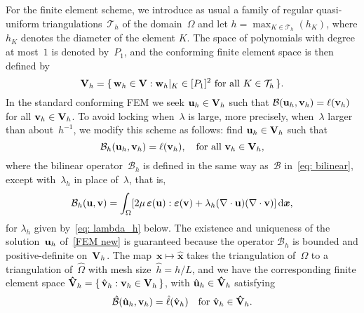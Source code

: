 \documentclass[11pt]{article}
\newcommand{\calB}{\mathcal{B}}
\newcommand{\calBhat}{\hat{\mathcal{B}}}
\newcommand{\vu}{{\bf u}}
\newcommand{\vv}{{\bf v}}
\newcommand{\vV}{{\bf V}}
\newcommand{\vVhat}{\mathbf{\hat V}}
\newcommand{\vw}{{\bf w}}
\newcommand{\bsx}{{\boldsymbol{x}}}
\numberwithin{equation}{section}
\newcommand{\veps}{{\boldsymbol{\varepsilon}}}
\newcommand{\ud}{\mathrm{d}}
\begin{document}
For the finite element scheme, we introduce as usual a family of regular 
quasi-uniform triangulations~$\mathcal{T}_h$ of the domain~$\Omega$ and let 
$h=\max_{K\in \mathcal{T}_h}(h_K)$, where $h_{K}$ denotes the diameter of 
the element $K$.  The space of polynomials with degree at most~$1$ is denoted  by~$P_1$, and the conforming finite element space is then defined by 
\[\vV_h=\{\,\vw_h \in {\bf V}:\text{$\vw_h |_K \in [P_1]^2$ for all $K \in \mathcal{T}_h$}\,\}.
\]
In the standard conforming FEM we seek $\vu_h \in  \vV_h$ such that
$\calB(\vu_h, \vv_h) = \ell(\vv_h)$ for all $\vv_h \in  \vV_h$. To
avoid locking when~$\lambda$ is large, more precisely,
when~$\lambda$ larger than about~$h^{-1}$, we modify this scheme as
follows: find $\vu_h \in  \vV_h$ such that
\begin{equation}\label{FEM new}
\calB_h(\vu_h,\vv_h)=\ell(\vv_h),\quad\text{for all $\vv_h\in\vV_h$},
\end{equation}
where the bilinear operator~$\calB_h$ is defined in the same way as~$\calB$
in~\eqref{eq: bilinear}, except with~$\lambda_h$ in place of~$\lambda$,
that is,
\begin{equation*}
\calB_h(\vu,\vv)=\int_\Omega[2\mu\,\veps(\vu):\veps(\vv)
    +\lambda_h(\nabla\cdot\vu)(\nabla\cdot\vv)]\,\ud\bsx,
\end{equation*} 
for $\lambda_h$ given by~\eqref{eq: lambda_h} below. The existence and
uniqueness of the solution~$\vu_h$ of~\eqref{FEM new} is guaranteed because the
operator $\calB_h$ is bounded and positive-definite on~$\vV_h$.
The map~$\bsx\mapsto\hat\bsx$ takes the triangulation of~$\Omega$ to a
triangulation of~$\widehat\Omega$ with mesh size~$\hat h=h/L$, and we have
the corresponding finite element space
$\vVhat_h=\{\,\hat\vv_h:\vv_h\in\vV_h\,\}$, with $\hat\vu_h\in\vVhat_h$
satisfying
\[
\calBhat(\hat\vu_h,\vv_h)=\hat\ell(\hat\vv_h)
\quad\text{for $\hat\vv_h\in\vVhat_h$.}
\]
\end{document}
